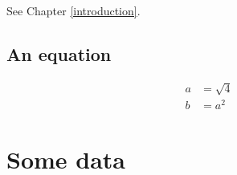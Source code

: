 See Chapter  \ref{introduction}.


\section{An equation}

\begin{align}
	a&=\sqrt{4} \\
	b&=a^2
\end{align}


\appendix
\chapter{Some data}

\lipsum[1]

\printbibliography





